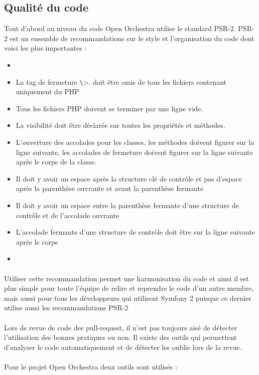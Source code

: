 \subsection{Qualité du code}
Tout d'abord au niveau du code Open Orchestra utilise le standard PSR-2. PSR-2 est un ensemble de recommandations sur le style et l'organisation du code dont voici les plus importantes : 
\begin{itemize}
\item[]
\item La tag de fermeture \verb?\?>. doit être omis de tous les fichiers contenant uniquement du PHP
\item Tous les fichiers PHP doivent se terminer par une ligne vide.
\item La visibilité doit être déclarée sur toutes les propriétés et méthodes.
\item L'ouverture des accolades pour les classes, les méthodes doivent figurer sur la ligne suivante, les accolades de fermeture doivent figurer sur la ligne suivante après le corps de la classe.
\item Il doit y avoir un espace après la structure clé de contrôle et pas d'espace après la parenthèse ouvrante et avant la parenthèse fermante
\item Il doit y avoir un espace entre la parenthèse fermante d'une structure de contrôle et de l'accolade
 ouvrante
 \item L'accolade fermante d'une structure de contrôle doit être sur la ligne suivante après le corps
 \item[]
\end{itemize}
\paragraph{}
Utiliser cette recommandation permet une harmonisation du code et ainsi il est plus simple pour toute l'équipe de relire et reprendre le code d'un autre membre, mais aussi pour tous les développeurs qui utilisent Symfony 2 puisque ce dernier utilise aussi les recommandations PSR-2
\paragraph{}
Lors de revue de code des pull-request, il n'est pas toujours aisé de détecter l'utilisation des bonnes pratiques ou non. Il existe des outils qui permettent d'analyser le code automatiquement et de détecter les oublie lors de la revue.
\paragraph{}
Pour le projet Open Orchestra deux outils sont utilisés : 
